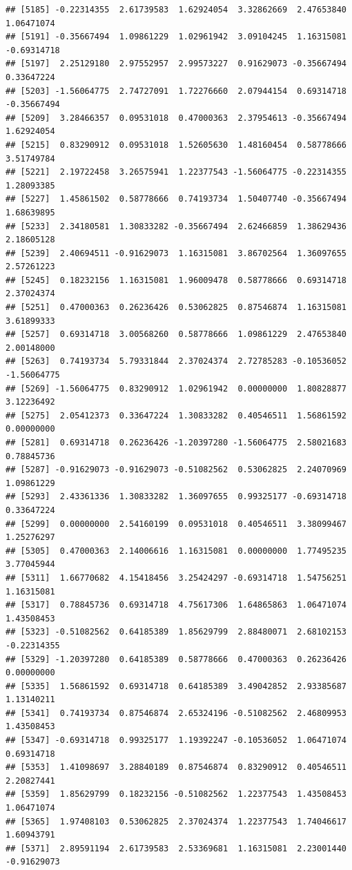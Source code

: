 \documentclass[
]{article}
\begin{document}
\begin{verbatim}
## [5185] -0.22314355  2.61739583  1.62924054  3.32862669  2.47653840  1.06471074
## [5191] -0.35667494  1.09861229  1.02961942  3.09104245  1.16315081 -0.69314718
## [5197]  2.25129180  2.97552957  2.99573227  0.91629073 -0.35667494  0.33647224
## [5203] -1.56064775  2.74727091  1.72276660  2.07944154  0.69314718 -0.35667494
## [5209]  3.28466357  0.09531018  0.47000363  2.37954613 -0.35667494  1.62924054
## [5215]  0.83290912  0.09531018  1.52605630  1.48160454  0.58778666  3.51749784
## [5221]  2.19722458  3.26575941  1.22377543 -1.56064775 -0.22314355  1.28093385
## [5227]  1.45861502  0.58778666  0.74193734  1.50407740 -0.35667494  1.68639895
## [5233]  2.34180581  1.30833282 -0.35667494  2.62466859  1.38629436  2.18605128
## [5239]  2.40694511 -0.91629073  1.16315081  3.86702564  1.36097655  2.57261223
## [5245]  0.18232156  1.16315081  1.96009478  0.58778666  0.69314718  2.37024374
## [5251]  0.47000363  0.26236426  0.53062825  0.87546874  1.16315081  3.61899333
## [5257]  0.69314718  3.00568260  0.58778666  1.09861229  2.47653840  2.00148000
## [5263]  0.74193734  5.79331844  2.37024374  2.72785283 -0.10536052 -1.56064775
## [5269] -1.56064775  0.83290912  1.02961942  0.00000000  1.80828877  3.12236492
## [5275]  2.05412373  0.33647224  1.30833282  0.40546511  1.56861592  0.00000000
## [5281]  0.69314718  0.26236426 -1.20397280 -1.56064775  2.58021683  0.78845736
## [5287] -0.91629073 -0.91629073 -0.51082562  0.53062825  2.24070969  1.09861229
## [5293]  2.43361336  1.30833282  1.36097655  0.99325177 -0.69314718  0.33647224
## [5299]  0.00000000  2.54160199  0.09531018  0.40546511  3.38099467  1.25276297
## [5305]  0.47000363  2.14006616  1.16315081  0.00000000  1.77495235  3.77045944
## [5311]  1.66770682  4.15418456  3.25424297 -0.69314718  1.54756251  1.16315081
## [5317]  0.78845736  0.69314718  4.75617306  1.64865863  1.06471074  1.43508453
## [5323] -0.51082562  0.64185389  1.85629799  2.88480071  2.68102153 -0.22314355
## [5329] -1.20397280  0.64185389  0.58778666  0.47000363  0.26236426  0.00000000
## [5335]  1.56861592  0.69314718  0.64185389  3.49042852  2.93385687  1.13140211
## [5341]  0.74193734  0.87546874  2.65324196 -0.51082562  2.46809953  1.43508453
## [5347] -0.69314718  0.99325177  1.19392247 -0.10536052  1.06471074  0.69314718
## [5353]  1.41098697  3.28840189  0.87546874  0.83290912  0.40546511  2.20827441
## [5359]  1.85629799  0.18232156 -0.51082562  1.22377543  1.43508453  1.06471074
## [5365]  1.97408103  0.53062825  2.37024374  1.22377543  1.74046617  1.60943791
## [5371]  2.89591194  2.61739583  2.53369681  1.16315081  2.23001440 -0.91629073

\end{verbatim}
\end{document}
